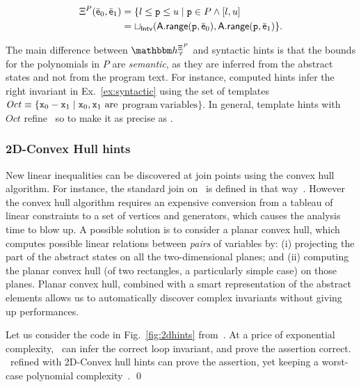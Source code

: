 \documentclass[sttt]{svjour}
\newcommand{\sopra}{}
\begin{document}
\begin{small}
\[
\begin{split}
\Xi^{P}(\bar{\mathsf{\mathsf{e}}}_0, \bar{\mathsf{\mathsf{e}}}_1) & =  \{ l \leq \mathtt{p} \leq u \mid
\mathtt{p} \in P \wedge [l, u]  \\
& = \sqcup_{\mathsf{Intv}}({\mathsf{A}}.\mathsf{\mathsf{range}}(\mathtt{p}, \bar{\mathsf{\mathsf{e}}}_0),
{\mathsf{A}}.\mathsf{\mathsf{range}}(\mathtt{p}, \bar{\mathsf{\mathsf{e}}}_1) \}.
\end{split}
\] 
\end{small}

The main difference between $\hint{\cjoin}^{\hintcomp^{P}}$ and
syntactic hints is that the bounds for the polynomials in $P$ are \emph{semantic},
as they are inferred from the abstract states and not from the
program text.
For instance, computed hints infer the right invariant in
Ex.~\ref{ex:syntactic}  using the set of templates $\mathit{Oct} \equiv \{ \mathtt{x}_0 - \mathtt{x}_1
\mid \mathtt{x}_0, \mathtt{x}_1\ \text{are}$ $\text{program}\
\text{variables} \}$.
In general, template hints with $\mathit{Oct}$ refine \SubPoly\
so to make it as precise as \Octagons.

\subsubsection{2D-Convex Hull hints}
New linear inequalities can be discovered at join points using the convex hull
algorithm.
For instance, the standard join on \Polyhedra\ is defined in that way~\cite{CousotHalbwachs78}.
However the convex hull algorithm requires an expensive conversion
from a tableau of linear constraints to a set of vertices and
generators, which causes the analysis time to blow up.
A possible solution is to consider a planar convex hull, which 
computes possible linear relations between \emph{pairs} of variables by: (i) projecting
the \Intervals part of the abstract states on all the two-dimensional planes; and (ii) computing the
planar convex hull (of two rectangles, a particularly simple case) on those planes. 
Planar convex hull, combined with a smart representation of the
abstract elements allows us to automatically discover complex invariants
without giving up performances.


\begin{example}
Let us consider the code in Fig.~\ref{fig:2dhints}
from~\cite{CousotHalbwachs78}.
At a price of exponential complexity, \Poly\ can infer the correct loop invariant, and prove the assertion
correct.
\Subpoly\ refined with 2D-Convex hull hints can prove the assertion,
yet keeping a worst-case polynomial complexity~\cite{LavironLogozzo09}. \qed
\end{example}
\end{document}
